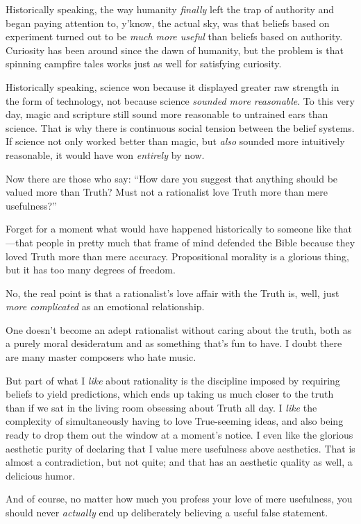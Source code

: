 {
 Historically speaking, the way humanity \textit{finally} left the
trap of authority and began paying attention to,
y'know, the actual sky, was that beliefs based on
experiment turned out to be \textit{much more useful} than beliefs
based on authority. Curiosity has been around since the dawn of
humanity, but the problem is that spinning campfire tales works just as
well for satisfying curiosity.}

{
 Historically speaking, science won because it displayed greater
raw strength in the form of technology, not because science
\textit{sounded more reasonable}. To this very day, magic and scripture
still sound more reasonable to untrained ears than science. That is why
there is continuous social tension between the belief systems. If
science not only worked better than magic, but \textit{also} sounded
more intuitively reasonable, it would have won \textit{entirely} by
now.}

{
 Now there are those who say: ``How dare you
suggest that anything should be valued more than Truth? Must not a
rationalist love Truth more than mere usefulness?''}

{
 Forget for a moment what would have happened historically to
someone like that---that people in pretty much that frame of mind
defended the Bible because they loved Truth more than mere accuracy.
Propositional morality is a glorious thing, but it has too many degrees
of freedom.}

{
 No, the real point is that a rationalist's love
affair with the Truth is, well, just \textit{more complicated} as an
emotional relationship.}

{
 One doesn't become an adept rationalist without
caring about the truth, both as a purely moral desideratum and as
something that's fun to have. I doubt there are many
master composers who hate music.}

{
 But part of what I \textit{like} about rationality is the
discipline imposed by requiring beliefs to yield predictions, which
ends up taking us much closer to the truth than if we sat in the living
room obsessing about Truth all day. I \textit{like} the complexity of
simultaneously having to love True-seeming ideas, and also being ready
to drop them out the window at a moment's notice. I
even like the glorious aesthetic purity of declaring that I value mere
usefulness above aesthetics. That is almost a contradiction, but not
quite; and that has an aesthetic quality as well, a delicious humor.}

{
 And of course, no matter how much you profess your love of mere
usefulness, you should never \textit{actually} end up deliberately
believing a useful false statement.}

